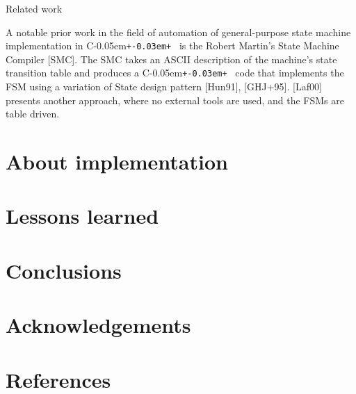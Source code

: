 \documentclass{netobjectdays}
\newcommand{\Cpp}{C\kern-0.05em\texttt{+\kern-0.03em+}%
}
\begin{document}
Related work

A notable prior work in the field of automation of general-purpose 
state machine implementation in \Cpp\ is the Robert Martin's State 
Machine Compiler [SMC]. The SMC takes an ASCII description of the 
machine's state transition table and produces a \Cpp\ code that 
implements the FSM using a variation of State design pattern [Hun91],
[GHJ+95]. [Laf00] presents another approach, where no external tools 
are used, and the FSMs are table driven. 


\section{About implementation}

\section{Lessons learned}

\section{Conclusions}
\section{Acknowledgements}
\section{References}

 
\end{document}
